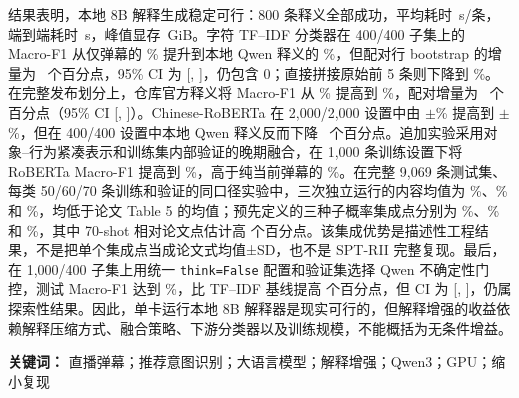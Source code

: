 \documentclass[UTF8,zihao=-4,a4paper]{ctexart}
\begin{document}
结果表明，本地 8B 解释生成稳定可行：800 条释义全部成功，平均耗时 \QwenGenerationMeanSeconds\,s/条，端到端耗时 \QwenGenerationWallSeconds\,s，峰值显存 \QwenGenerationPeakGiB\,GiB。字符 TF--IDF 分类器在 400/400 子集上的 Macro-F1 从仅弹幕的 \SmallContentMacroF\% 提升到本地 Qwen 释义的 \SmallQwenMacroF\%，但配对行 bootstrap 的增量为 \SmallQwenDeltaPP\ 个百分点，95\% CI 为 [\SmallQwenDeltaLowPP, \SmallQwenDeltaHighPP]，仍包含 0；直接拼接原始前 5 条则下降到 \SmallRawMacroF\%。在完整发布划分上，仓库官方释义将 Macro-F1 从 \FullContentMacroF\% 提高到 \FullOfficialMacroF\%，配对增量为 \FullOfficialDeltaPP\ 个百分点（95\% CI [\FullOfficialDeltaLowPP, \FullOfficialDeltaHighPP]）。Chinese-RoBERTa 在 2,000/2,000 设置中由 \RobertaMainContentMean$\pm$\RobertaMainContentSD\% 提高到 \RobertaMainOfficialMean$\pm$\RobertaMainOfficialSD\%，但在 400/400 设置中本地 Qwen 释义反而下降 \RobertaSmallQwenDeltaPP\ 个百分点。追加实验采用对象--行为紧凑表示和训练集内部验证的晚期融合，在 1,000 条训练设置下将 RoBERTa Macro-F1 提高到 \ImproveRobertaLargeLateFusion\%，高于纯当前弹幕的 \ImproveRobertaLargeContent\%。在完整 9,069 条测试集、每类 50/60/70 条训练和验证的同口径实验中，三次独立运行的内容均值为 \PaperMatchedContentMeanFifty\%、\PaperMatchedContentMeanSixty\% 和 \PaperMatchedContentMeanSeventy\%，均低于论文 Table 5 的均值；预先定义的三种子概率集成点分别为 \PaperMatchedContentEnsembleFifty\%、\PaperMatchedContentEnsembleSixty\% 和 \PaperMatchedContentEnsembleSeventy\%，其中 70-shot 相对论文点估计高 \PaperMatchedContentEnsembleDeltaSeventy 个百分点。该集成优势是描述性工程结果，不是把单个集成点当成论文式均值±SD，也不是 SPT-RII 完整复现。最后，在 1,000/400 子集上用统一 \texttt{think=False} 配置和验证集选择 Qwen 不确定性门控，测试 Macro-F1 达到 \GateMacroF\%，比 TF--IDF 基线提高 \GateDeltaPP 个百分点，但 CI 为 [\GateCILowPP, \GateCIHighPP]，仍属探索性结果。因此，单卡运行本地 8B 解释器是现实可行的，但解释增强的收益依赖解释压缩方式、融合策略、下游分类器以及训练规模，不能概括为无条件增益。

\noindent\textbf{关键词：} 直播弹幕；推荐意图识别；大语言模型；解释增强；Qwen3；GPU；缩小复现
\end{document}

